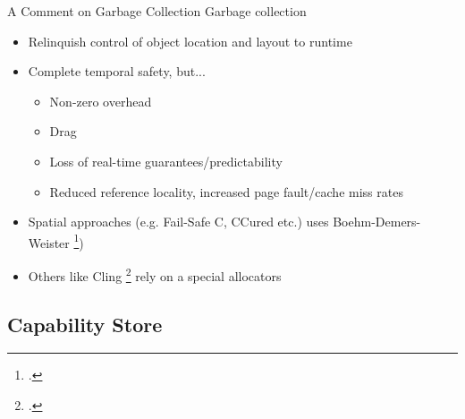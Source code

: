\documentclass[aspectratio=169]{beamer}
\begin{document}
\begin{frame}{A Comment on Garbage Collection}
Garbage collection
    \begin{itemize}
        \item Relinquish control of object location and layout to runtime 
        \item Complete temporal safety, but...
        \begin{itemize}
            \item Non-zero overhead
            \item Drag
            \item Loss of real-time guarantees/predictability
            \item Reduced reference locality, increased page fault/cache miss rates
        \end{itemize}
        \item Spatial approaches (e.g. Fail-Safe C, CCured etc.) uses Boehm-Demers-Weister \footcite{boehm_garbage_1988})
        \item Others like Cling \footcite{akritidis_cling:_???} rely on a special allocators %
    \end{itemize}
\end{frame}

\subsection{Capability Store}
\end{document}
